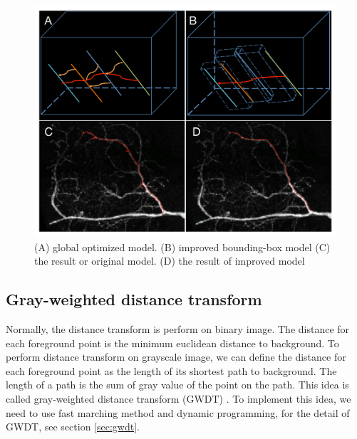 \begin{figure}[htb]
\begin{center}
\includegraphics[width=5in]{images/fm_dynamic_compare}
\caption{(A) global optimized model. (B) improved bounding-box model (C) the result or original model. (D) the result of improved model}
\label{fig:fm-dynamic-compare}
\end{center}
\end{figure}
\subsection{Gray-weighted distance transform}
Normally, the distance transform is perform on binary image. The distance for each foreground point is the minimum euclidean distance to background. To perform distance transform on grayscale image, we can define the distance for each foreground point as the length of its shortest path to background. The length of a path is the sum of gray value of the point on the path. This idea is called gray-weighted distance transform (GWDT) \cite{rutovitz1968data}. To implement this idea, we need to use fast marching method and dynamic programming, for the detail of GWDT, see section \ref{sec:gwdt}.

